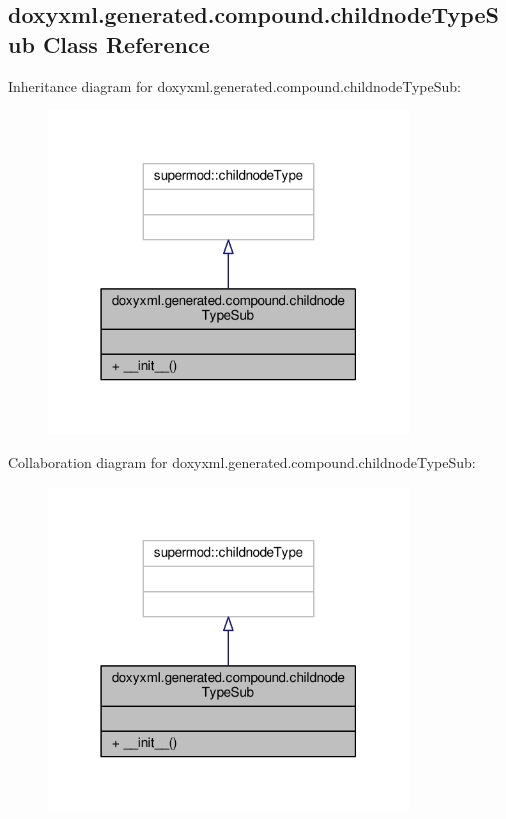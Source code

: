 \subsection{doxyxml.\+generated.\+compound.\+childnode\+Type\+Sub Class Reference}
\label{classdoxyxml_1_1generated_1_1compound_1_1childnodeTypeSub}


Inheritance diagram for doxyxml.\+generated.\+compound.\+childnode\+Type\+Sub\+:
\nopagebreak
\begin{figure}[H]
\begin{center}
\leavevmode
\includegraphics[width=271pt]{d4/d70/classdoxyxml_1_1generated_1_1compound_1_1childnodeTypeSub__inherit__graph}
\end{center}
\end{figure}


Collaboration diagram for doxyxml.\+generated.\+compound.\+childnode\+Type\+Sub\+:
\nopagebreak
\begin{figure}[H]
\begin{center}
\leavevmode
\includegraphics[width=271pt]{d5/de9/classdoxyxml_1_1generated_1_1compound_1_1childnodeTypeSub__coll__graph}
\end{center}
\end{figure}
